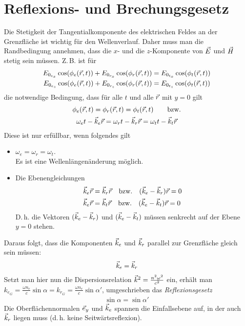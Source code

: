 
\section{Reflexions- und Brechungsgesetz}
Die Stetigkeit der Tangentialkomponente des elektrischen Feldes an der
Grenzfläche ist wichtig für den Wellenverlauf.
Daher muss man die Randbedingung annehmen, dass die $x$- und die
$z$-Komponente von $\vec{E}$ und $\vec{H}$ stetig sein müssen.
Z.\,B. ist für
\begin{align*}
  E_{0_{e_x}} \cos(\phi_e(\vec{r},t)) 
  +  E_{0_{r_x}} \cos(\phi_r(\vec{r},t)) 
  &=   E_{0_{t_x}} \cos(\phi_t(\vec{r},t)) \\
  E_{0_{e_z}} \cos(\phi_e(\vec{r},t)) 
  +  E_{0_{r_z}} \cos(\phi_r(\vec{r},t)) 
  &=   E_{0_{t_z}} \cos(\phi_t(\vec{r},t)) \\
\end{align*}
die notwendige Bedingung, dass für alle $t$ und alle $\vec{r}$
mit $y=0$ gilt
\begin{gather*}
  \phi_e(\vec{r}, t) = \phi_r(\vec{r},t) = \phi_t(\vec{r}, t) 
  \qquad\text{bzw.}\\
  \omega_et- \vec{k}_e\vec{r} = \omega_rt- \vec{k}_r\vec{r} = \omega_tt- \vec{k}_t\vec{r}
\end{gather*}
Diese ist nur erfüllbar, wenn folgendes gilt
\begin{itemize}
\item $\omega_e=\omega_r=\omega_t$.\\
   Es ist eine Wellenlängenänderung möglich.
\item Die Ebenengleichungen
  \begin{align*}
    \vec{k}_e\vec{r} &= \vec{k}_r\vec{r} \quad\text{bzw.} \quad(\vec{k}_e-\vec{k}_r)\vec{r}=0\\
    \vec{k}_e\vec{r} &= \vec{k}_t\vec{r} \quad\text{bzw.} \quad(\vec{k}_e-\vec{k}_t)\vec{r}=0
  \end{align*}
  D.\,h. die Vektoren $(\vec{k}_e-\vec{k}_r)$
  und $(\vec{k}_e-\vec{k}_t)$ müssen senkrecht auf der Ebene $y=0$ stehen.
\end{itemize}
Daraus folgt, dass die Komponenten $\vec{k}_e$ und $\vec{k}_r$ parallel
zur Grenzfläche gleich sein müssen:
\begin{gather*}
  \vec{k}_e = \vec{k}_r
\end{gather*}
Setzt man hier nun die Dispersionsrelation 
$\vec{k}^2 = \frac{n^2\omega^2}{c^2}$ ein, erhält man
$k_{e_G} = \frac{\omega n_e}{c}\sin\alpha = k_{r_G} 
= \frac{\omega n_e}{c}\sin\alpha'$, umgeschrieben das
\emph{Reflexionsgesetz}
\begin{gather*}
  \sin\alpha = \sin\alpha'
\end{gather*}
Die Oberflächennormalen $\vec{e}_y$ und $\vec{k}_e$ spannen die
Einfallsebene auf, in der auch $\vec{k}_r$ liegen muss (d.\,h. keine
Seitwärtsreflexion).

